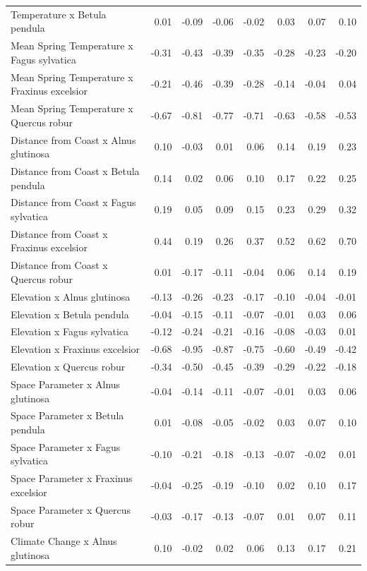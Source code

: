 \documentclass{article}\usepackage[]{graphicx}\usepackage[]{color}
\begin{document}
\begin{longtable}{lrrrrrrr}
Temperature
x Betula pendula & 0.01 & -0.09 & -0.06 & -0.02 & 0.03 & 0.07 & 0.10 \\ 
  Mean Spring 
Temperature
x Fagus sylvatica & -0.31 & -0.43 & -0.39 & -0.35 & -0.28 & -0.23 & -0.20 \\ 
  Mean Spring 
Temperature
x Fraxinus excelsior & -0.21 & -0.46 & -0.39 & -0.28 & -0.14 & -0.04 & 0.04 \\ 
  Mean Spring 
Temperature
x Quercus robur & -0.67 & -0.81 & -0.77 & -0.71 & -0.63 & -0.58 & -0.53 \\ 
  Distance from 
Coast
x Alnus glutinosa & 0.10 & -0.03 & 0.01 & 0.06 & 0.14 & 0.19 & 0.23 \\ 
  Distance from 
Coast
x Betula pendula & 0.14 & 0.02 & 0.06 & 0.10 & 0.17 & 0.22 & 0.25 \\ 
  Distance from 
Coast
x Fagus sylvatica & 0.19 & 0.05 & 0.09 & 0.15 & 0.23 & 0.29 & 0.32 \\ 
  Distance from 
Coast
x Fraxinus excelsior & 0.44 & 0.19 & 0.26 & 0.37 & 0.52 & 0.62 & 0.70 \\ 
  Distance from 
Coast
x Quercus robur & 0.01 & -0.17 & -0.11 & -0.04 & 0.06 & 0.14 & 0.19 \\ 
  Elevation
x Alnus glutinosa & -0.13 & -0.26 & -0.23 & -0.17 & -0.10 & -0.04 & -0.01 \\ 
  Elevation
x Betula pendula & -0.04 & -0.15 & -0.11 & -0.07 & -0.01 & 0.03 & 0.06 \\ 
  Elevation
x Fagus sylvatica & -0.12 & -0.24 & -0.21 & -0.16 & -0.08 & -0.03 & 0.01 \\ 
  Elevation
x Fraxinus excelsior & -0.68 & -0.95 & -0.87 & -0.75 & -0.60 & -0.49 & -0.42 \\ 
  Elevation
x Quercus robur & -0.34 & -0.50 & -0.45 & -0.39 & -0.29 & -0.22 & -0.18 \\ 
  Space Parameter
x Alnus glutinosa & -0.04 & -0.14 & -0.11 & -0.07 & -0.01 & 0.03 & 0.06 \\ 
  Space Parameter
x Betula pendula & 0.01 & -0.08 & -0.05 & -0.02 & 0.03 & 0.07 & 0.10 \\ 
  Space Parameter
x Fagus sylvatica & -0.10 & -0.21 & -0.18 & -0.13 & -0.07 & -0.02 & 0.01 \\ 
  Space Parameter
x Fraxinus excelsior & -0.04 & -0.25 & -0.19 & -0.10 & 0.02 & 0.10 & 0.17 \\ 
  Space Parameter
x Quercus robur & -0.03 & -0.17 & -0.13 & -0.07 & 0.01 & 0.07 & 0.11 \\ 
  Climate Change
x Alnus glutinosa & 0.10 & -0.02 & 0.02 & 0.06 & 0.13 & 0.17 & 0.21 \\ 

\end{longtable}
\end{document}
